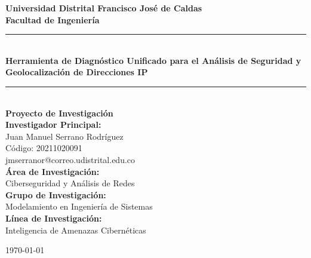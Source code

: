 \begin{titlepage}
\centering
\vspace*{1cm}

\textbf{\Large Universidad Distrital Francisco José de Caldas}\\
\textbf{\large Facultad de Ingeniería}\\
\vspace{1cm}

\rule{\linewidth}{0.2mm} \\[0.4cm]
{\huge \bfseries Herramienta de Diagnóstico Unificado para el Análisis de Seguridad y Geolocalización de Direcciones IP}\\
\rule{\linewidth}{0.2mm} \\[1.5cm]

{\large \textbf{Proyecto de Investigación}}\\[1cm]

{\large \textbf{Investigador Principal:}}\\
Juan Manuel Serrano Rodríguez\\
Código: 20211020091\\
jmserranor@correo.udistrital.edu.co\\[2cm]

{\large \textbf{Área de Investigación:}}\\
Ciberseguridad y Análisis de Redes\\[1cm]

{\large \textbf{Grupo de Investigación:}}\\
Modelamiento en Ingeniería de Sistemas\\[1cm]

{\large \textbf{Línea de Investigación:}}\\
Inteligencia de Amenazas Cibernéticas\\[2cm]

\vfill

{\large \today}

\end{titlepage}
